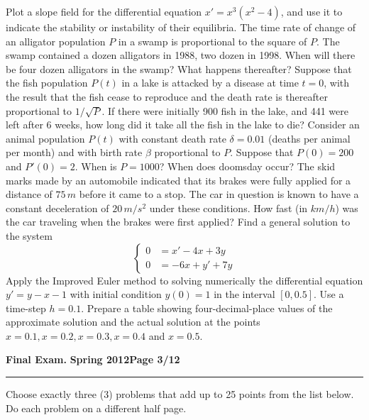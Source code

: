 \documentclass[12pt]{article}
\begin{document}
{\problem[5pts] Plot a slope field for the differential equation
$x'=x^3(x^2-4)$, and use it to indicate the stability or instability of their
equilibria.}
{\problem[5pts] The time rate of change of an alligator population $P$ in a
swamp is proportional to the square of $P$.  The swamp contained a dozen
alligators in 1988, two dozen in 1998.  When will there be four dozen
alligators in the swamp?  What happens thereafter?}
{\problem[10pts] Suppose that the fish population $P(t)$ in a lake is attacked
by a disease at time $t=0$, with the result that the fish cease to reproduce
and the death rate is thereafter proportional to $1/\sqrt{P}$.  If there were
initially 900 fish in the lake, and 441 were left after 6 weeks, how long did
it take all the fish in the lake to die?}
{\problem[10pts] Consider an animal population $P(t)$ with constant death rate
$\delta = 0.01$ (deaths per animal per month) and with birth rate $\beta$
proportional to $P$.  Suppose that $P(0)=200$ and $P'(0)=2$.  When is $P=1000$?
When does doomsday occur?}
{\problem[5pts] The skid marks made by an automobile indicated that its brakes
were fully applied for a distance of $75\, m$ before it came to a stop.  The car
in question is known to have a constant deceleration of $20\, m/s^2$ under these conditions.  How fast (in $km/h$) was the car traveling when the brakes were first applied?}
{\problem[5pts] Find a general solution to the system}
\begin{equation*}
\begin{cases} 0 &=x' -4x+3y \\ 0&=-6x+y'+7y  \end{cases}
\end{equation*}
{\problem[10pts] Apply the Improved Euler method to solving numerically the
differential equation $y'=y-x-1$ with initial condition $y(0)=1$ in the
interval $[0,0.5]$.  Use a time-step $h=0.1$.  Prepare a table showing
four-decimal-place values of the approximate solution and the actual solution
at the points $x=0.1, x=0.2, x=0.3, x=0.4$ and $x=0.5$.}
\newpage


\hfill{\large\bf Final Exam.}\hfill{\large\bf
  Spring 2012}\hfill{\large\bf Page 3/12}\hrule

\vspace{0.5cm}
 Choose exactly three (3) problems that add up to 25 points from the list below.   Do each problem on a different half page.
\end{document}
